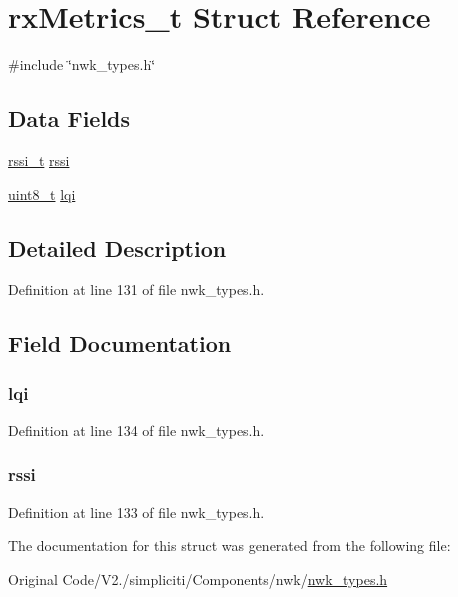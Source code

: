 \hypertarget{structrxMetrics__t}{\section{rx\-Metrics\-\_\-t \-Struct \-Reference}
\label{structrxMetrics__t}
}


{\ttfamily \#include \char`\"{}nwk\-\_\-types.\-h\char`\"{}}

\subsection*{\-Data \-Fields}
\begin{DoxyCompactItemize}
\item 
\hyperlink{nwk__types_8h_a35d5bc216e33176cc91f2bbff3bb66cc}{rssi\-\_\-t} \hyperlink{structrxMetrics__t_a587690cf0776e3ab29f446ea6dc988d4}{rssi}
\item 
\hyperlink{bsp__msp430__defs_8h_aba7bc1797add20fe3efdf37ced1182c5}{uint8\-\_\-t} \hyperlink{structrxMetrics__t_a0dd69605aea6dba42ffd851067dbfe77}{lqi}
\end{DoxyCompactItemize}


\subsection{\-Detailed \-Description}


\-Definition at line 131 of file nwk\-\_\-types.\-h.



\subsection{\-Field \-Documentation}
\hypertarget{structrxMetrics__t_a0dd69605aea6dba42ffd851067dbfe77}{
\subsubsection[{lqi}]{ {\bf lqi}}}\label{structrxMetrics__t_a0dd69605aea6dba42ffd851067dbfe77}


\-Definition at line 134 of file nwk\-\_\-types.\-h.

\hypertarget{structrxMetrics__t_a587690cf0776e3ab29f446ea6dc988d4}{
\subsubsection[{rssi}]{ {\bf rssi}}}\label{structrxMetrics__t_a587690cf0776e3ab29f446ea6dc988d4}


\-Definition at line 133 of file nwk\-\_\-types.\-h.



\-The documentation for this struct was generated from the following file\-:\begin{DoxyCompactItemize}
\item 
\-Original Code/\-V2./simpliciti/\-Components/nwk/\hyperlink{nwk__types_8h}{nwk\-\_\-types.\-h}\end{DoxyCompactItemize}
